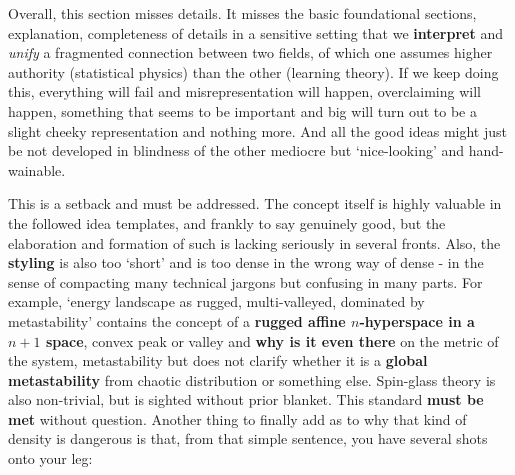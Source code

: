Overall, this section misses details. It misses the basic foundational sections, explanation, completeness of details in a sensitive setting that we \textbf{interpret} and \textit{unify} a fragmented connection between two fields, of which one assumes higher authority (statistical physics) than the other (learning theory). If we keep doing this, everything will fail and misrepresentation will happen, overclaiming will happen, something that seems to be important and big will turn out to be a slight cheeky representation and nothing more. And all the good ideas might just be not developed in blindness of the other mediocre but `nice-looking' and hand-wainable. 

This is a setback and must be addressed. The concept itself is highly valuable in the followed idea templates, and frankly to say genuinely good, but the elaboration and formation of such is lacking seriously in several fronts. Also, the \textbf{styling} is also too `short' and is too dense in the wrong way of dense - in the sense of compacting many technical jargons but confusing in many parts. For example, `energy landscape as rugged, multi-valleyed, dominated by metastability' contains the concept of a \textbf{rugged affine $n$-hyperspace in a $n+1$ space},  convex peak or valley and \textbf{why is it even there} on the metric of the system, metastability but does not clarify whether it is a \textbf{global metastability} from chaotic distribution or something else. Spin-glass theory is also non-trivial, but is sighted without prior blanket. This standard \textbf{must be met} without question. Another thing to finally add as to why that kind of density is dangerous is that, from that simple sentence, you have several shots onto your leg:

